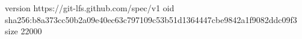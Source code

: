 version https://git-lfs.github.com/spec/v1
oid sha256:b8a373cc50b2a09e40ec63c797109c53b51d1364447cbe9842a1f9082ddc09f3
size 22000

